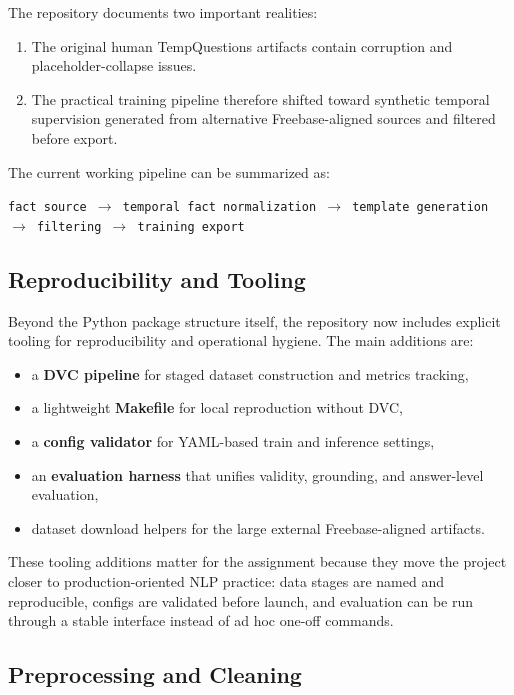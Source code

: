 \documentclass[a4paper,11pt]{article}
\begin{document}
The repository documents two important realities:

\begin{enumerate}[leftmargin=1.4cm]
  \item The original human TempQuestions artifacts contain corruption and placeholder-collapse issues.
  \item The practical training pipeline therefore shifted toward synthetic temporal supervision generated from alternative Freebase-aligned sources and filtered before export.
\end{enumerate}

The current working pipeline can be summarized as:

\begin{center}
\texttt{fact source $\rightarrow$ temporal fact normalization $\rightarrow$ template generation $\rightarrow$ filtering $\rightarrow$ training export}
\end{center}

\subsection{Reproducibility and Tooling}

Beyond the Python package structure itself, the repository now includes explicit tooling for reproducibility and operational hygiene. The main additions are:

\begin{itemize}[leftmargin=1.2cm]
  \item a \textbf{DVC pipeline} for staged dataset construction and metrics tracking,
  \item a lightweight \textbf{Makefile} for local reproduction without DVC,
  \item a \textbf{config validator} for YAML-based train and inference settings,
  \item an \textbf{evaluation harness} that unifies validity, grounding, and answer-level evaluation,
  \item dataset download helpers for the large external Freebase-aligned artifacts.
\end{itemize}

These tooling additions matter for the assignment because they move the project closer to production-oriented NLP practice: data stages are named and reproducible, configs are validated before launch, and evaluation can be run through a stable interface instead of ad hoc one-off commands.

\subsection{Preprocessing and Cleaning}
\end{document}
